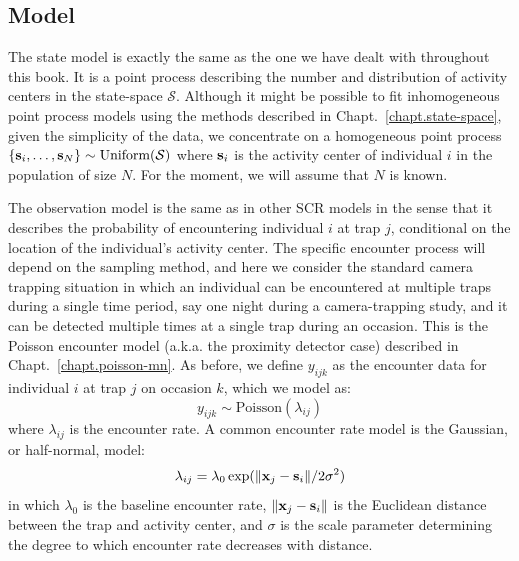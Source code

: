 
\subsection{Model}

The state model is exactly the same as the one we have dealt with
throughout
this book. It is a point process describing the number and distribution of
activity centers in the state-space $\mathcal{S}$. Although it might
be possible to fit inhomogeneous point process models using the
methods described in Chapt.~\ref{chapt.state-space},
given the simplicity of the data, we concentrate on a homogeneous point process
$\{{\bf s}_i, \ldots, {\bf s}_N\} \sim \text{Uniform}(\mathcal{S})$
where ${\bf s}_i$ is the activity center of individual $i$ in the
population of size $N$. For the moment, we will assume that $N$ is
known.

The observation model is the same as in other SCR models %
in the sense that it describes the probability of encountering individual
$i$ at trap $j$, conditional on the location of the individual's
activity center. The specific encounter process will depend on the
sampling method, and here we consider the standard camera trapping
situation in which an individual can be encountered at multiple traps
during a single time period, say one night during a camera-trapping
study, and it can be detected multiple times at a single trap during
an occasion. This is the Poisson encounter model (a.k.a. the proximity
detector case) described in
Chapt.~\ref{chapt.poisson-mn}. As before, we define $y_{ijk}$ as the
encounter data for individual $i$ at trap $j$ on occasion $k$, which
we model as:
\begin{equation}
 y_{ijk} \sim \mbox{Poisson}(\lambda_{ij})
\label{eq.latentPoisson}
\end{equation}
where $\lambda_{ij}$ is the encounter rate. A common encounter rate model is the
Gaussian, or half-normal, model:
\[
\lambda_{ij} = \lambda_0 \exp(\| {\bf x}_j - {\bf s}_i \| / 2\sigma^2)
\]
in which $\lambda_0$ is the baseline encounter rate,
$\| {\bf x}_j - {\bf s}_i
\|$ is the Euclidean distance between the trap and activity center, and $\sigma$ is the
scale parameter determining the degree to which encounter rate decreases with
distance.

